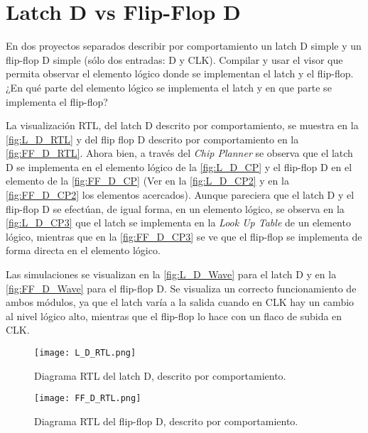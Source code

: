 \section{Latch D vs Flip-Flop D \label{sec:s4}}

\begin{center}
	\begin{minipage}{12cm}
		\begin{tcolorbox}[title=Actividad 4]
			En dos proyectos separados describir por comportamiento  un latch D simple y un flip-flop D simple (sólo dos entradas: D y CLK). Compilar y usar el visor que permita observar el elemento lógico donde se implementan el latch y el flip-flop. ¿En qué parte del elemento lógico se implementa el latch y en que parte se implementa el flip-flop?
		\end{tcolorbox}	
	\end{minipage}
\end{center}

La visualización RTL, del latch D descrito por comportamiento, se muestra en la \autoref{fig:L_D_RTL} y del flip flop D descrito por comportamiento en la \autoref{fig:FF_D_RTL}. Ahora bien, a través del \textit{Chip Planner} se observa que el latch D se implementa en el elemento lógico de la \autoref{fig:L_D_CP} y el flip-flop D en el elemento de la \autoref{fig:FF_D_CP} (Ver en la \autoref{fig:L_D_CP2} y en la \autoref{fig:FF_D_CP2} los elementos acercados). Aunque pareciera que el latch D y el flip-flop D se efectúan, de igual forma, en un elemento lógico, se observa en la \autoref{fig:L_D_CP3} que el latch se implementa en la \textit{Look Up Table} de un elemento lógico, mientras que en la \autoref{fig:FF_D_CP3} se ve que el flip-flop se implementa de forma directa en el elemento lógico.

Las simulaciones se visualizan en la \autoref{fig:L_D_Wave} para el latch D y en la \autoref{fig:FF_D_Wave} para el flip-flop D. Se visualiza un correcto funcionamiento de ambos módulos, ya que el latch varía a la salida cuando en CLK hay un cambio al nivel lógico alto, mientras que el flip-flop lo hace con un flaco de subida en CLK.

\begin{figure}[ht]
	\centering
	\texttt{[image: L\_D\_RTL.png]}
	\caption{Diagrama RTL del latch D, descrito por comportamiento. \label{fig:L_D_RTL}}
\end{figure}

\begin{figure}[ht]
	\centering
	\texttt{[image: FF\_D\_RTL.png]}
	\caption{Diagrama RTL del flip-flop D, descrito por comportamiento. \label{fig:FF_D_RTL}}
\end{figure}

